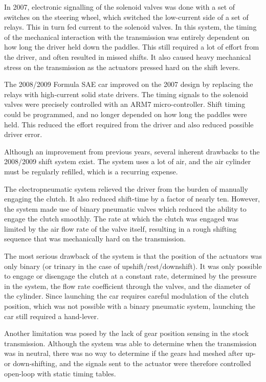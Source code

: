 In 2007, electronic signalling of the solenoid valves was done with a set of switches on the steering wheel, which switched the low-current side of a set of relays. This in turn fed current to the solenoid valves. In this system, the timing of the mechanical interaction with the transmission was entirely dependent on how long the driver held down the paddles. This still required a lot of effort from the driver, and often resulted in missed shifts. It also caused heavy mechanical stress on the transmission as the actuators pressed hard on the shift levers.

The 2008/2009 Formula SAE car improved on the 2007 design by replacing the relays with high-current solid state drivers. The timing signals to the solenoid valves were precisely controlled with an ARM7 micro-controller. Shift timing could be programmed, and no longer depended on how long the paddles were held. This  reduced the effort required from the driver and also reduced possible driver error.

Although an improvement from previous years, several inherent drawbacks to the 2008/2009 shift system exist. The system uses a lot of air, and the air cylinder must be regularly refilled, which is a recurring expense.

The electropneumatic system relieved the driver from the burden of manually engaging the clutch. It also reduced shift-time by a factor of nearly ten. However, the system made use of binary pneumatic valves which reduced the ability to engage the clutch smoothly. The rate at which the clutch was engaged was limited by the air flow rate of the valve itself, resulting in a rough shifting sequence that was mechanically hard on the transmission. 

The most serious drawback of the system is that the position of the actuators was only binary (or trinary in the case of upshift/rest/downshift). It was only possible to engage or disengage the clutch at a constant rate, determined by the pressure in the system, the flow rate coefficient through the valves, and the diameter of the cylinder. Since launching the car requires careful modulation of the clutch position, which was not possible with a binary pneumatic system, launching the car still required a hand-lever.

Another limitation was posed by the lack of gear position sensing in the stock transmission. Although the system was able to determine when the transmission was in neutral, there was no way to determine if the gears had meshed after up- or down-shifting, and the signals sent to the actuator were therefore controlled open-loop with static timing tables.